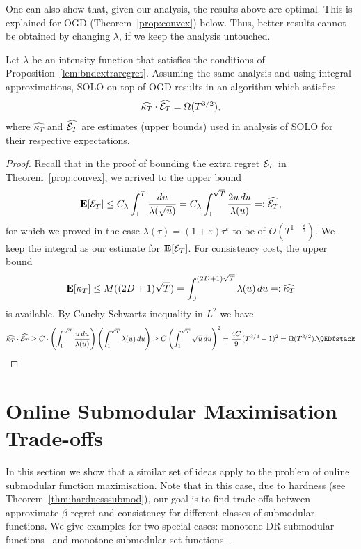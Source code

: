 One can also show that, given our analysis, the results above are optimal. This is explained for OGD (Theorem~\ref{prop:convex}) below. Thus, better results cannot be obtained by changing $\lambda$, if we keep the analysis untouched.
\begin{theorem}\label{thm:optimality} Let $\lambda$ be an intensity function that satisfies the conditions of Proposition~\ref{lem:bndextraregret}. Assuming the same analysis and using integral approximations, SOLO on top of OGD results in an  algorithm which satisfies
    \[
        \widehat{\kappa_T}\cdot \widehat{\mathcal{E}_T} = \Omega(T^{3/2}),
    \]
    where $\widehat{\kappa_T}$ and $\widehat{\mathcal{E}_T}$ are estimates (upper bounds) used in analysis of SOLO for their respective expectations.
\end{theorem}
\begin{proof}
    Recall that in the proof of bounding the extra regret $\mathcal{E}_T$ in Theorem~\ref{prop:convex}, we arrived to the upper bound
    \[
        \mathbf{E}[\mathcal{E}_T] \leq C_\lambda \int_1^T \frac{du}{\lambda(\sqrt{u})} = C_\lambda \int_1^{\sqrt{T}} \frac{2u\,du}{\lambda(u)} =: \widehat{\mathcal{E}_T},
    \]
    for which we proved in the case $\lambda(\tau) = (1+\varepsilon)\tau^\varepsilon$ to be of $O(T^{1- \frac{\varepsilon}{2}})$. We keep the integral as our estimate for $\mathbf{E}[\mathcal{E}_T]$. For consistency cost, the upper bound
    \[
        \mathbf{E}[\kappa_T] \leq  M((2D+1)\sqrt{T}) = \int_0^{(2D + 1)\sqrt{T}} \lambda(u)\,du =: \widehat{\kappa_T}
    \]
    is available. By Cauchy-Schwartz inequality in $L^2$ we have
    \[
        \widehat{\kappa_T}\cdot \widehat{\Ecal_T} \geq C\cdot\left( \int_1^{\sqrt{T}} \frac{u\, du}{\lambda(u)} \right) \left( \int_1^{\sqrt{T}} \lambda(u)\,du \right) \geq C \left(\int_1^{\sqrt{T}} \sqrt{u}\,du \right)^2 =\frac{4C}{9}(T^{3/4} - 1)^2 = \Omega(T^{3/2}).\qedhere
    \]
\end{proof}
\section{Online Submodular Maximisation Trade-offs}\label{sec:submodapplication}
In this section we show that a similar set of ideas apply to the problem of online submodular function maximisation. Note that in this case, due to hardness (see Theorem~\ref{thm:hardnesssubmod}), our goal is to find trade-offs between approximate $\beta$-regret and consistency for different classes of submodular functions. We give examples for two special cases: monotone DR-submodular functions~\cite{bian2016guaranteed} and monotone submodular set functions~\cite{nemhauser1978analysis}. 


